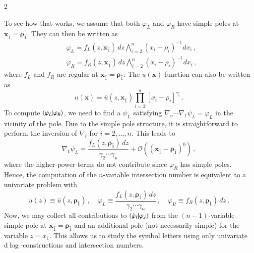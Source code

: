 \documentclass[fleqn]{2023SCGE}
\newcommand{\nn}{\nonumber}
\newcommand{\nd}{\mathrm{d}}
\begin{document}
\begin{multicols}{2}
\begin{appendix}
To see how that works, we assume that both $\varphi_L$ and $\varphi_R$ have simple poles at $\bm{x}_{\hat{1}} = \bm{\rho}_{\hat{1}}$. They can then be written as
\begin{align}
    &\varphi_L = f_L(z,\bm{x}_{\hat{1}}) \, dz \bigwedge_{i=2}^{n} \left( x_i - \rho_i \right)^{-1} dx_i \, , \nn\\
    &\varphi_R = f_R(z,\bm{x}_{\hat{1}}) \, dz \bigwedge_{i=2}^{n} \left( x_i - \rho_i \right)^{-1} dx_i \, ,
\end{align}
where $f_L$ and $f_R$ are regular at $\bm{x}_{\hat{1}} = \bm{\rho}_{\hat{1}}$. The $u(\bm{x})$ function can also be written as
\begin{equation}
u(\bm{x}) = \bar{u}(z,\bm{x}_{\hat{1}}) \prod_{i=2}^{n} \left[ x_i - \rho_i \right]^{\gamma_i} \,.
\end{equation}
To compute $\braket{\varphi_L | \varphi_R}$, we need to find a $\psi_L$ satisfying $\nabla_n \cdots \nabla_1 \psi_L = \varphi_L$ in the vicinity of the pole. Due to the simple pole structure, it is straightforward to perform the inversion of $\nabla_i$ for $i=2,\ldots,n$. This leads to 
\begin{equation}
    \nabla_1 \psi_L = \frac{f_L(z,\bm{\rho}_{\hat{1}}) \, dz}{\gamma_2 \cdots \gamma_n} + \mathcal{O}((\bm{x}_{\hat{1}}-\bm{\rho}_{\hat{1}})^0) \, ,
\end{equation}
where the higher-power terms do not contribute since $\varphi_R$ has simple poles. Hence, the computation of the $n$-variable intersection number is equivalent to a univariate problem with
\begin{equation}
    u(z) \equiv \bar{u}(z,\bm{\rho}_{\hat{1}}) \, , \quad \varphi_L \equiv \frac{f_L(z,\bm{\rho}_{\hat{1}}) \, dz}{\gamma_2 \cdots \gamma_n} \,, \quad \varphi_R \equiv f_R(z,\bm{\rho}_{\hat{1}}) \, dz \,.
\end{equation}
Now, we may collect all contributions to $\braket{\dot{\varphi}_I | \varphi_J}$ from the $(n-1)$-variable simple pole at $\bm{x}_{\hat{1}} = \bm{\rho}_{\hat{1}}$ and an additional pole (not necessarily simple) for the variable $z=x_1$. This allows us to study the symbol letters using only univariate $\nd\log$-constructions and intersection numbers.


\end{appendix}
\end{multicols}
\end{document}
